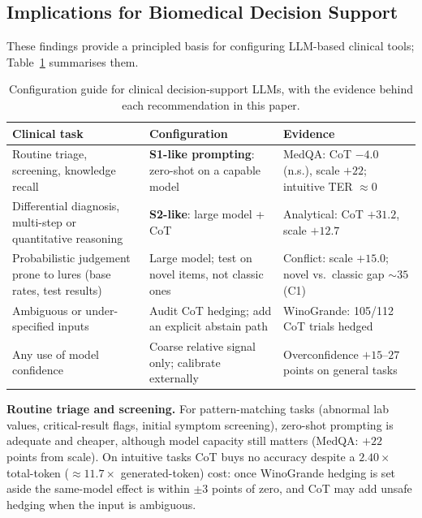 \documentclass[conference]{IEEEtran}
\begin{document}
\subsection{Implications for Biomedical Decision Support}

These findings provide a principled basis for configuring LLM-based clinical tools; Table~\ref{tab:deployment} summarises them.

\begin{table}[t]
\caption{Configuration guide for clinical decision-support LLMs, with the evidence behind each recommendation in this paper.}
\label{tab:deployment}
\centering
\footnotesize
\renewcommand{\arraystretch}{1.05}
\begin{tabular}{@{}>{\raggedright\arraybackslash}p{}>{\raggedright\arraybackslash}p{}>{\raggedright\arraybackslash}p{}@{}}
\toprule
Clinical task & Configuration & Evidence \\
\midrule
Routine triage, screening, knowledge recall & \textbf{S1-like prompting}: zero-shot on a capable model & MedQA: CoT $-4.0$ (n.s.), scale $+22$; intuitive TER $\approx 0$ \\
\addlinespace[2pt]
Differential diagnosis, multi-step or quantitative reasoning & \textbf{S2-like}: large model + CoT & Analytical: CoT $+31.2$, scale $+12.7$ \\
\addlinespace[2pt]
Probabilistic judgement prone to lures (base rates, test results) & Large model; test on novel items, not classic ones & Conflict: scale $+15.0$; novel vs.\ classic gap ${\sim}35$ (C1) \\
\addlinespace[2pt]
Ambiguous or under-specified inputs & Audit CoT hedging; add an explicit abstain path & WinoGrande: 105/112 CoT trials hedged \\
\addlinespace[2pt]
Any use of model confidence & Coarse relative signal only; calibrate externally & Overconfidence $+15$--$27$ points on general tasks \\
\bottomrule
\end{tabular}
\end{table}

\textbf{Routine triage and screening.} For pattern-matching tasks (abnormal lab values, critical-result flags, initial symptom screening), zero-shot prompting is adequate and cheaper, although model capacity still matters (MedQA: $+22$ points from scale). On intuitive tasks CoT buys no accuracy despite a $2.40\times$ total-token ($\approx 11.7\times$ generated-token) cost: once WinoGrande hedging is set aside the same-model effect is within ${\pm}3$ points of zero, and CoT may add unsafe hedging when the input is ambiguous.
\end{document}
